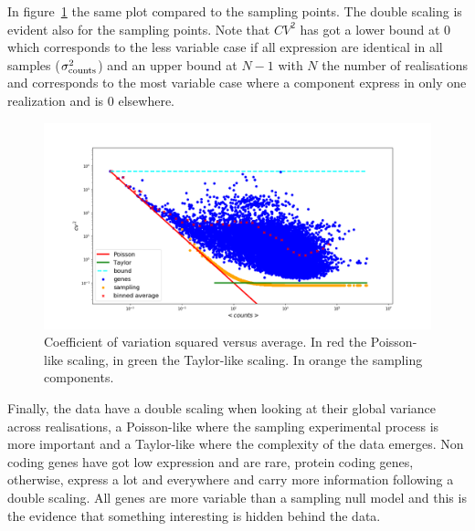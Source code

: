 In figure~\ref{fig:scalinglaws/gtex/cvmean_loglog_sampling} the same plot compared to the sampling points. The double scaling is evident also for the sampling points. Note that $CV^2$ has got a lower bound at $0$ which corresponds to the less variable case if all expression are identical in all samples ($\sigma^2_{\mathrm{counts}}$) and an upper bound at $N-1$ with $N$ the number of realisations and corresponds to the most variable case where a component  express in only one realization and is $0$ elsewhere.
\begin{figure}[htb!]
    \centering
    \includegraphics[width=0.9\linewidth]{pictures/scalinglaws/gtex/cvmean_loglog_sampling.png}
    \caption{Coefficient of variation squared versus average. In \textcolor{pythonred}{red} the Poisson-like scaling, in \textcolor{pythongreen}{green} the Taylor-like scaling. In \textcolor{pythonorange}{orange} the sampling components.}
    \label{fig:scalinglaws/gtex/cvmean_loglog_sampling}
\end{figure}

Finally, the data have a double scaling when looking at their global variance across realisations, a Poisson-like where the sampling experimental process is more important and a Taylor-like where the complexity of the data emerges.
Non coding genes have got low expression and are rare, protein coding genes, otherwise, express a lot and everywhere and carry more information following a double scaling. All genes are more variable than a sampling null model and this is the evidence that something interesting is hidden behind the data.
